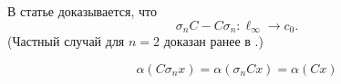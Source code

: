В статье \cite[лемма 15]{semenov2019mainclasses_rus} доказывается, что
\begin{equation}
	\sigma_n C - C \sigma_n : \ell_\infty \to c_0
	.
\end{equation}
(Частный случай для $n=2$ доказан ранее в \cite[lemma 16]{Semenov2010invariant}.)

\begin{corollary}
	$$
		\alpha(C\sigma_n x) =
		\alpha(\sigma_n Cx) =
		\alpha(Cx)
	$$
\end{corollary}
